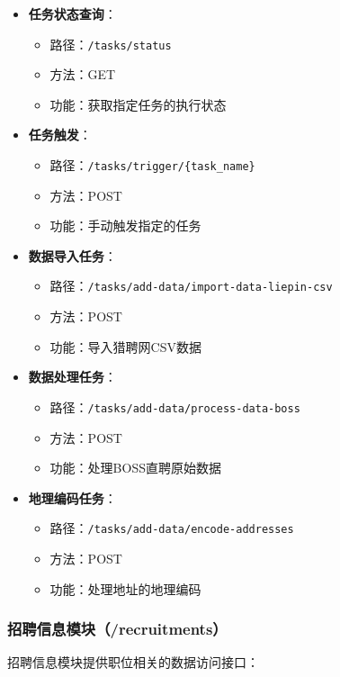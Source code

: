 \begin{itemize}
    \item \textbf{任务状态查询}：
    \begin{itemize}
        \item 路径：\texttt{/tasks/status}
        \item 方法：GET
        \item 功能：获取指定任务的执行状态
    \end{itemize}
    
    \item \textbf{任务触发}：
    \begin{itemize}
        \item 路径：\texttt{/tasks/trigger/\{task\_name\}}
        \item 方法：POST
        \item 功能：手动触发指定的任务
    \end{itemize}
    
    \item \textbf{数据导入任务}：
    \begin{itemize}
        \item 路径：\texttt{/tasks/add-data/import-data-liepin-csv}
        \item 方法：POST
        \item 功能：导入猎聘网CSV数据
    \end{itemize}
    
    \item \textbf{数据处理任务}：
    \begin{itemize}
        \item 路径：\texttt{/tasks/add-data/process-data-boss}
        \item 方法：POST
        \item 功能：处理BOSS直聘原始数据
    \end{itemize}
    
    \item \textbf{地理编码任务}：
    \begin{itemize}
        \item 路径：\texttt{/tasks/add-data/encode-addresses}
        \item 方法：POST
        \item 功能：处理地址的地理编码
    \end{itemize}
\end{itemize}

\subsubsection{招聘信息模块（/recruitments）}
招聘信息模块提供职位相关的数据访问接口：

